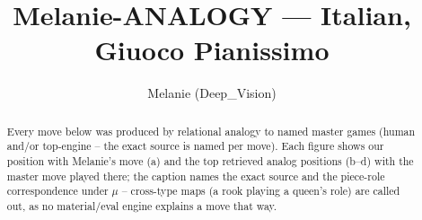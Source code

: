 \documentclass[11pt]{article}
\title{Melanie-ANALOGY — Italian, Giuoco Pianissimo}
\author{Melanie (Deep\_Vision)}
\date{}
\begin{document}
\maketitle

\begin{abstract}Every move below was produced by relational analogy to named master games (human and/or top-engine -- the exact source is named per move). Each figure shows our position with Melanie's move (a) and the top retrieved analog positions (b--d) with the master move played there; the caption names the exact source and the piece-role correspondence under $\mu$ -- cross-type maps (a rook playing a queen's role) are called out, as no material/eval engine explains a move that way.\end{abstract}

\begin{figure}[p]\centering
\begin{subfigure}{0.46\textwidth}\centering
\resizebox{\linewidth}{!}{%
\newchessgame
\chessboard[
  setfen={r1bq1rk1/ppp2ppp/2np1n2/2b1p3/2B1P3/2PP1N2/PP3PPP/RNBQ1RK1 w - - 2 7},
  showmover=false,
  pgfstyle=straightmove, color=movearrow, markmove={f1-e1}
]}
\caption{}
\end{subfigure}\hfill
\begin{subfigure}{0.46\textwidth}\centering
\resizebox{\linewidth}{!}{%
\newchessgame
\chessboard[
  setfen={r1bq1rk1/1pp2ppp/p1np1n2/2b1p3/P1B1P3/2PP1N2/1P3PPP/RNBQ1RK1 w - - 1 8},
  showmover=false,
  pgfstyle=straightmove, color=movearrow, markmove={f1-e1}
]}
\caption{}
\end{subfigure}
\\[4pt]
\begin{subfigure}{0.46\textwidth}\centering
\resizebox{\linewidth}{!}{%
\newchessgame
\chessboard[
  setfen={r1bq1rk1/ppp2ppp/2np1n2/2b1p3/2B1P3/2PP1N2/PP3PPP/RNBQ1RK1 w - - 0 7},
  showmover=false,
  pgfstyle=straightmove, color=movearrow, markmove={f1-e1}
]}
\caption{}
\end{subfigure}\hfill
\begin{subfigure}{0.46\textwidth}\centering
\resizebox{\linewidth}{!}{%
\newchessgame
\chessboard[
  setfen={r1bq1rk1/ppp2ppp/2np1n2/2b1p3/2B1P3/2PP1N2/PP3PPP/RNBQ1RK1 w - - 0 7},
  showmover=false,
  pgfstyle=straightmove, color=movearrow, markmove={f1-e1}
]}
\caption{}
\end{subfigure}

\end{figure}
\end{document}
